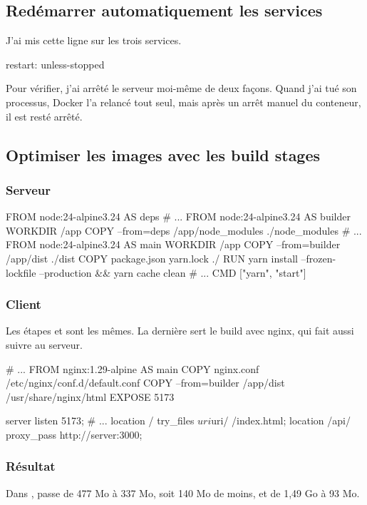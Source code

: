 \subsection{Redémarrer automatiquement les services}

J'ai mis cette ligne sur les trois services.

\begin{fichier}
restart: unless-stopped
\end{fichier}

Pour vérifier, j'ai arrêté le serveur moi-même de deux façons. Quand j'ai tué son processus, Docker l'a relancé tout seul, mais après un arrêt manuel du conteneur, il est resté arrêté.

\subsection{Optimiser les images avec les build stages}

\subsubsection{Serveur}

\begin{fichier}[docker]
FROM node:24-alpine3.24 AS deps
# ...
FROM node:24-alpine3.24 AS builder
WORKDIR /app
COPY --from=deps /app/node_modules ./node_modules
# ...
FROM node:24-alpine3.24 AS main
WORKDIR /app
COPY --from=builder /app/dist ./dist
COPY package.json yarn.lock ./
RUN yarn install --frozen-lockfile --production && yarn cache clean
# ...
CMD ["yarn", "start"]
\end{fichier}

\subsubsection{Client}

Les étapes  et  sont les mêmes. La dernière sert le build avec nginx, qui fait aussi suivre  au serveur.

\begin{fichier}[docker]
# ...
FROM nginx:1.29-alpine AS main
COPY nginx.conf /etc/nginx/conf.d/default.conf
COPY --from=builder /app/dist /usr/share/nginx/html
EXPOSE 5173
\end{fichier}

\begin{fichier}[nginx]
server {
    listen 5173;
    # ...
    location / {
        try_files $uri $uri/ /index.html;
    }
    location /api/ {
        proxy_pass http://server:3000;
    }
}
\end{fichier}

\subsubsection{Résultat}

\begin{commandes}
\end{commandes}

Dans ,  passe de 477 Mo à 337 Mo, soit 140 Mo de moins, et  de 1,49 Go à 93 Mo.
